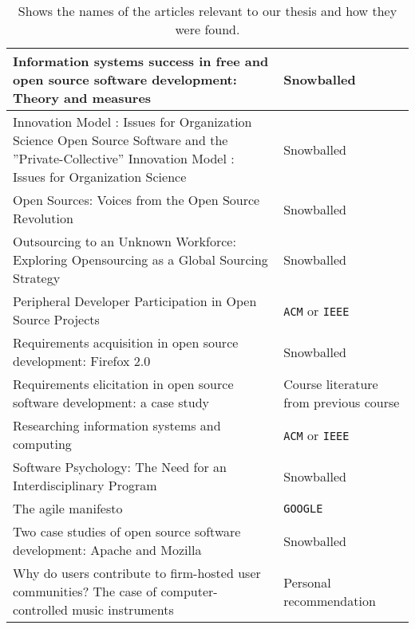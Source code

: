 \documentclass[11pt, oneside]{article}   	%
\begin{document}
\begin{table}[!h]
\begin{tabular}{  p{}  p{} }
		Information systems success in free and open source software development: Theory and measures	& Snowballed	\\\hline
		Innovation Model : Issues for Organization Science Open Source Software and the ''Private-Collective'' Innovation Model : Issues for Organization Science	& Snowballed	\\\hline
		Open Sources: Voices from the Open Source Revolution	& Snowballed	\\\hline
		Outsourcing to an Unknown Workforce: Exploring Opensourcing as a Global Sourcing Strategy	& Snowballed	\\\hline
		Peripheral Developer Participation in Open Source Projects	& \texttt{ACM} or \texttt{IEEE}	\\\hline
		Requirements acquisition in open source development: Firefox 2.0	& Snowballed	\\\hline
		Requirements elicitation in open source software development: a case study	& Course literature from previous course	\\\hline
		Researching information systems and computing	& \texttt{ACM} or \texttt{IEEE}	\\\hline
		Software Psychology: The Need for an Interdisciplinary Program	& Snowballed	\\\hline
		The agile manifesto	& \texttt{GOOGLE}	\\\hline
		Two case studies of open source software development: Apache and Mozilla	& Snowballed	\\\hline
		Why do users contribute to firm-hosted user communities? The case of computer-controlled music instruments	& Personal recommendation	\\\hline
	\end{tabular}
	\caption{Shows the names of the articles relevant to our thesis and how they were found.}
	\label{tab:relevant}
\end{table}


\end{document}
